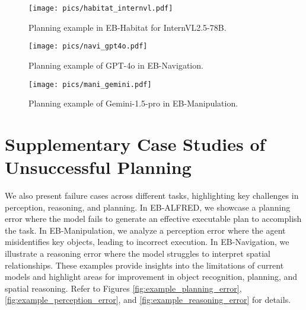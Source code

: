 \begin{figure*}[t]
\begin{center}
\texttt{[image: pics/habitat\_internvl.pdf]}
\end{center}
\vspace{-1em}
\caption{Planning example in EB-Habitat for InternVL2.5-78B.}
\label{fig:example_hab_internVL}
\end{figure*}

\begin{figure*}[t]
\begin{center}
\texttt{[image: pics/navi\_gpt4o.pdf]}
\end{center}
\vspace{-1em}
\caption{Planning example of GPT-4o in EB-Navigation.}
\label{fig:example_nav_gpt4o}
\end{figure*}

\begin{figure*}[t]
\begin{center}
\texttt{[image: pics/mani\_gemini.pdf]}
\end{center}
\vspace{-1em}
\caption{Planning example of Gemini-1.5-pro in EB-Manipulation.}
\label{fig:example_man_gemini}
\end{figure*}


\clearpage
\section{Supplementary Case Studies of Unsuccessful Planning}

We also present failure cases across different tasks, highlighting key challenges in perception, reasoning, and planning. In EB-ALFRED, we showcase a planning error where the model fails to generate an effective executable plan to accomplish the task. In EB-Manipulation, we analyze a perception error where the agent misidentifies key objects, leading to incorrect execution. In EB-Navigation, we illustrate a reasoning error where the model struggles to interpret spatial relationships. These examples provide insights into the limitations of current models and highlight areas for improvement in object recognition, planning, and spatial reasoning. Refer to Figures \ref{fig:example_planning_error}, \ref{fig:example_perception_error}, and \ref{fig:example_reasoning_error} for details.

